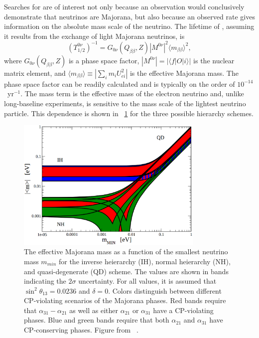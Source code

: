 Searches for \zvbb are of interest not only because an observation would conclusively demonstrate that neutrinos are Majorana, but also because an observed rate gives information on the absolute mass scale of the neutrino.  The lifetime of \zvbb, assuming it results from the exchange of light Majorana neutrinos, is 
\begin{equation}
(T^{0\nu}_{1/2})^{-1} = G_{0\nu}(Q_{\beta\beta},Z)|M^{0\nu}|^2 {\langle}m_{\beta\beta}{\rangle}^2,
\end{equation}
where $G_{0\nu}(Q_{\beta\beta},Z)$ is a phase space factor, $|M^{0\nu}| = |{\langle}f|O|i{\rangle}|$ is the nuclear matrix element, and $\displaystyle {\langle}m_{\beta\beta}{\rangle} \equiv |\sum_{i}m_i U_{ei}^2|$ is the effective Majorana mass.  The phase space factor can be readily calculated \citep{hadron_zvbb_Suhonen} and is typically on the order of $10^{-14}$~yr$^{-1}$.  The mass term is the effective mass of the electron neutrino and, unlike long-baseline experiments, is sensitive to the mass scale of the lightest neutrino particle.  This dependence is shown in {\fig}~\ref{fig:effectiveMajoranaMass} for the three possible hierarchy schemes.  
\begin{figure}[htp]
\centering
\includegraphics[width=0.8\textwidth]{figures/effectiveMajoranaMass.eps}
\caption[The effective Majorana mass as a function of the smallest neutrino mass.]{The effective Majorana mass as a function of the smallest neutrino mass $m_{min}$ for the inverse heierarchy (IH), normal heierarchy (NH), and quasi-degenerate (QD) scheme.  The values are shown in bands indicating the $2\sigma$ uncertainty.  For all values, it is assumed that $\sin^2{\theta}_{13} = 0.0236$ and $\delta = 0$.  Colors distinguish between different CP-violating scenarios of the Majorana phases.  Red bands require that $\alpha_{31}-\alpha_{21}$ as well as either $\alpha_{21}$ or $\alpha_{31}$ have a CP-violating phases.  Blue and green bands require that both $\alpha_{21}$ and $\alpha_{31}$ have CP-conserving phases.  Figure from {}~\citep{PDG}.}
\label{fig:effectiveMajoranaMass}
\end{figure}

